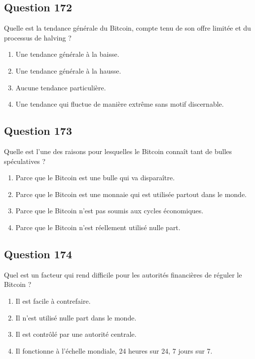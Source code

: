 \documentclass[12pt,a4paper]{article}
\begin{document}
\bigskip


\subsection*{Question 172}
Quelle est la tendance générale du Bitcoin, compte tenu de son offre limitée et du processus de halving ?

\begin{enumerate}[label=\Alph*., leftmargin=*]
\item Une tendance générale à la baisse.
\item Une tendance générale à la hausse.
\item Aucune tendance particulière.
\item Une tendance qui fluctue de manière extrême sans motif discernable.
\end{enumerate}

\bigskip


\subsection*{Question 173}
Quelle est l'une des raisons pour lesquelles le Bitcoin connaît tant de bulles spéculatives ?

\begin{enumerate}[label=\Alph*., leftmargin=*]
\item Parce que le Bitcoin est une bulle qui va disparaître.
\item Parce que le Bitcoin est une monnaie qui est utilisée partout dans le monde.
\item Parce que le Bitcoin n'est pas soumis aux cycles économiques.
\item Parce que le Bitcoin n'est réellement utilisé nulle part.
\end{enumerate}

\bigskip


\subsection*{Question 174}
Quel est un facteur qui rend difficile pour les autorités financières de réguler le Bitcoin ?

\begin{enumerate}[label=\Alph*., leftmargin=*]
\item Il est facile à contrefaire.
\item Il n'est utilisé nulle part dans le monde.
\item Il est contrôlé par une autorité centrale.
\item Il fonctionne à l'échelle mondiale, 24 heures sur 24, 7 jours sur 7.
\end{enumerate}
\end{document}
